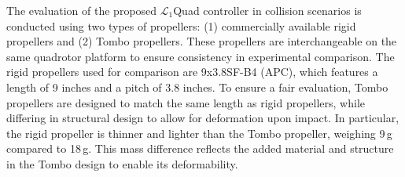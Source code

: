 The evaluation of the proposed $\mathcal{L}_1$Quad controller in collision scenarios is conducted using two types of propellers: (1) commercially available rigid propellers and (2) Tombo propellers. These propellers are interchangeable on the same quadrotor platform to ensure consistency in experimental comparison. The rigid propellers used for comparison are 9x3.8SF-B4 (APC), which features a length of 9 inches and a pitch of 3.8 inches. To ensure a fair evaluation, Tombo propellers are designed to match the same length as rigid propellers, while differing in structural design to allow for deformation upon impact. In particular, the rigid propeller is thinner and lighter than the Tombo propeller, weighing 9\,g compared to 18\,g. This mass difference reflects the added material and structure in the Tombo design to enable its deformability.


